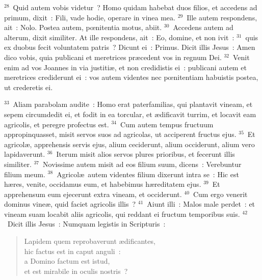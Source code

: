 ${}^{28}$~Quid autem vobis videtur~? Homo quidam habebat duos filios, et accedens ad primum, dixit~: Fili, vade hodie, operare in vinea mea.
${}^{29}$~Ille autem respondens, ait~: Nolo. Postea autem, pœnitentia motus, abiit.
${}^{30}$~Accedens autem ad alterum, dixit similiter. At ille respondens, ait~: Eo, domine, et non ivit~:
${}^{31}$~quis ex duobus fecit voluntatem patris~? Dicunt ei~: Primus. Dicit illis Jesus~: Amen dico vobis, quia publicani et meretrices pr\ae cedent vos in regnum Dei.
${}^{32}$~Venit enim ad vos Joannes in via justiti\ae , et non credidistis ei~: publicani autem et meretrices crediderunt ei~: vos autem videntes nec pœnitentiam habuistis postea, ut crederetis ei.


${}^{33}$~Aliam parabolam audite~: Homo erat paterfamilias, qui plantavit vineam, et sepem circumdedit ei, et fodit in ea torcular, et \ae dificavit turrim, et locavit eam agricolis, et peregre profectus est.
${}^{34}$~Cum autem tempus fructuum appropinquasset, misit servos suos ad agricolas, ut acciperent fructus ejus.
${}^{35}$~Et agricol\ae , apprehensis servis ejus, alium ceciderunt, alium occiderunt, alium vero lapidaverunt.
${}^{36}$~Iterum misit alios servos plures prioribus, et fecerunt illis similiter.
${}^{37}$~Novissime autem misit ad eos filium suum, dicens~: Verebuntur filium meum.
${}^{38}$~Agricol\ae\ autem videntes filium dixerunt intra se~: Hic est h\ae res, venite, occidamus eum, et habebimus h\ae reditatem ejus.
${}^{39}$~Et apprehensum eum ejecerunt extra vineam, et occiderunt.
${}^{40}$~Cum ergo venerit dominus vine\ae , quid faciet agricolis illis~?
${}^{41}$~Aiunt illi~: Malos male perdet~: et vineam suam locabit aliis agricolis, qui reddant ei fructum temporibus suis.
${}^{42}$~Dicit illis Jesus~: Numquam legistis in Scripturis~: \begin{flushleft}\begin{verse}Lapidem quem reprobaverunt \ae dificantes,\\ hic factus est in caput anguli~:\\ a Domino factum est istud,\\ et est mirabile in oculis nostris~?\end{verse}\end{flushleft}


